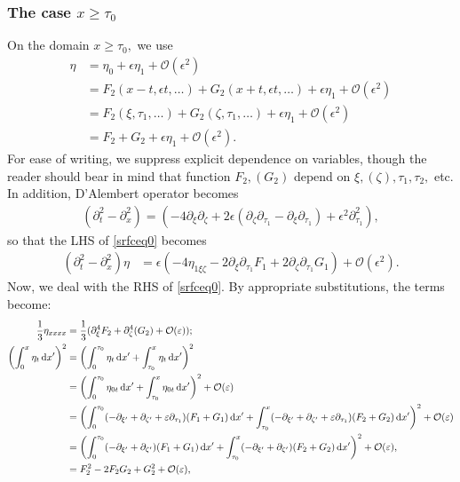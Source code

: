 \documentclass[10pt,reqno,oneside,a4paper, landscape]{article}
\begin{document}
\subsubsection*{The case $x\geq \tau_0$}
On the domain $x\geq \tau_0,$ we use 
\begin{align*}
\eta &= \eta_0 + \epsilon \eta_1 + \mathcal{O}(\epsilon^2)  \\
&= F_2(x-t, \epsilon t, \ldots) + G_2(x+t, \epsilon t, \ldots) + \epsilon \eta_1 + \mathcal{O}(\epsilon^2) \\
&= F_2(\xi, \tau_1, \ldots) + G_2(\zeta, \tau_1, \ldots) + \epsilon \eta_1 + \mathcal{O}(\epsilon^2) \\
&= F_2+G_2 + \epsilon \eta_1 +  \mathcal{O}(\epsilon^2).
\end{align*}
For ease of writing, we suppress explicit dependence on variables, though the reader should bear in mind that function $F_2, (G_2)$ depend on $\xi, (\zeta), \tau_1, \tau_2,$ etc. In addition, D'Alembert operator becomes 
\begin{align*}
(\partial_t^2 - \partial_x^2) = \left( - 4\partial_\xi \partial_\zeta + 2\epsilon(\partial_\zeta \partial_{\tau_1} - \partial_\xi\partial_{\tau_1}) + \epsilon^2 \partial_{\tau_1}^2 \right),
\end{align*}
so that the LHS of \eqref{srfceq0} becomes
\begin{align}
(\partial_t^2 - \partial_x^2) \eta &= \epsilon \left(- 4\eta_{1\xi \zeta} - 2\partial_{\xi}\partial_{\tau_1} F_1 + 2\partial_{\zeta}\partial_{\tau_1}G_1\right) + \mathcal{O}(\epsilon^2). \label{LHS1-2}
\end{align}
Now, we deal with the RHS of \eqref{srfceq0}. By appropriate substitutions, the terms become:
\begin{align*}
\frac{1}{3}\eta_{xxxx} &= \frac{1}{3}(\partial_\xi^4 F_2 + \partial_\zeta^4(G_2)+ \mathcal{O}(\varepsilon)); \\
\left( \int^{x}_{0} \eta_t \,\mathrm{d} x' \right)^2 &= \left( \int^{\tau_0}_{0} \eta_t \,\mathrm{d} x' + \int_{\tau_0}^{x} \eta_t \,\mathrm{d} x' \right)^2 \\
&= \left( \int^{\tau_0}_{0} \eta_{0t} \,\mathrm{d} x' + \int_{\tau_0}^{x} \eta_{0t} \,\mathrm{d} x' \right)^2 + \mathcal{O}(\varepsilon) \\ 
&= \left( \int^{\tau_0}_{0} (-\partial_{\xi'} + \partial_{\zeta'} + \varepsilon \partial_{\tau_1}) (F_1+G_1) \,\mathrm{d} x' + \int_{\tau_0}^{x} (-\partial_{\xi'} + \partial_{\zeta'} + \varepsilon \partial_{\tau_1}) (F_2+G_2) \,\mathrm{d} x' \right)^2 + \mathcal{O}(\varepsilon) \\
&= \left( \int^{\tau_0}_{0} (-\partial_{\xi'} + \partial_{\zeta'}) (F_1+G_1) \,\mathrm{d} x' + \int_{\tau_0}^{x} (-\partial_{\xi'} + \partial_{\zeta'}) (F_2+G_2) \,\mathrm{d} x' \right)^2 + \mathcal{O}(\varepsilon), \\
&= F^2_2 - 2F_2 G_2 + G_2^2 + \mathcal{O}(\varepsilon),
\end{align*}
\end{document}
